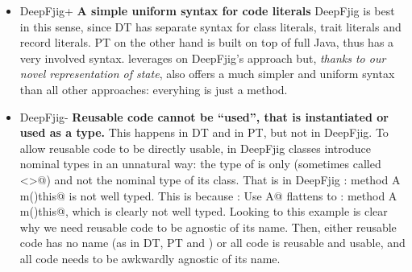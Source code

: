 \begin{itemize}
\item DeepFjig+ {\bf A simple uniform syntax for code literals}
DeepFjig is best in this sense, since DT has separate syntax for class literals, trait literals and record literals.
PT on the other hand is built on top of full Java, thus has a very
involved syntax.
\name leverages on DeepFjig's approach but,
\emph{thanks to our novel representation of state}, \name also offers a much simpler and uniform syntax than
all other approaches: everyhing is just a method.
\item DeepFjig-
{\bf Reusable code cannot be ``used'', that is instantiated or used as a type.}
This happens in DT and in PT, but not in DeepFjig. To allow reusable code to be directly 
usable, in DeepFjig
classes introduce nominal types in an unnatural way: the type of
\Q@this@ is only \Q@This@ (sometimes called \Q@<>@) and not the
nominal type of its class. 
That is in DeepFjig 
\Q@A:{ method A m()this}@ is not well typed. This is because
\Q@B: Use A@ flattens to \Q@B:{ method A m()this}@, which is clearly not well typed.
Looking to this example is clear why we need reusable code to be agnostic of its name.
Then, either reusable code has no name (as in DT, PT and \name)
or all code is reusable and usable, and all code needs to be awkwardly agnostic of its name.


\end{itemize}
